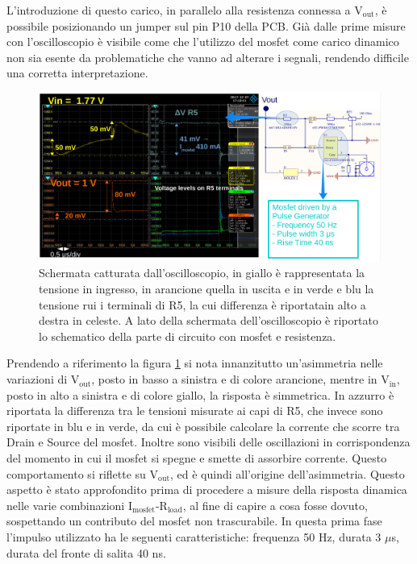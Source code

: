 L'introduzione di questo carico, in parallelo alla resistenza connessa a $\mathrm{V_{out}}$, è possibile posizionando un jumper sul pin P10 della PCB. Già dalle prime misure con l'oscilloscopio è visibile come che l'utilizzo del mosfet come carico dinamico non sia esente da problematiche che vanno ad alterare i segnali, rendendo difficile una corretta interpretazione. 
\begin{figure}
\centering
\includegraphics[scale=.2]{Immagini/TransientTest}
\caption{Schermata catturata dall'oscilloscopio, in giallo è rappresentata la tensione in ingresso, in arancione quella in uscita e in verde e blu la tensione rui i terminali di R5, la cui differenza è riportatain alto a destra in celeste. A lato della schermata dell'oscilloscopio è riportato lo schematico della parte di circuito con mosfet e resistenza.} 
\label{TransientTest}
\end{figure} 
Prendendo a riferimento la figura \ref{TransientTest} si nota innanzitutto un'asimmetria nelle variazioni di $\mathrm{V_{out}}$, posto in basso a sinistra e di colore arancione, mentre in $\mathrm{V_{in}}$, posto in alto a sinistra e di colore giallo, la risposta è simmetrica. In azzurro è riportata la differenza tra le tensioni misurate ai capi di R5, che invece sono riportate in blu e in verde, da cui è possibile calcolare la corrente che scorre tra Drain e Source del mosfet. 
Inoltre sono visibili delle oscillazioni in corrispondenza del momento in cui il mosfet si spegne e smette di assorbire corrente. Questo comportamento si riflette su $\mathrm{V_{out}}$, ed è quindi all'origine dell'asimmetria. Questo aspetto è stato approfondito prima di procedere a misure della risposta dinamica nelle varie combinazioni $\mathrm{I_{mosfet}}$-$\mathrm{R_{load}}$, al fine di capire a cosa fosse dovuto, sospettando un contributo del mosfet non trascurabile.
In questa prima fase l'impulso utilizzato ha le seguenti caratteristiche: frequenza 50 Hz, durata 3 $\mu$s, durata del fronte di salita 40 ns.


